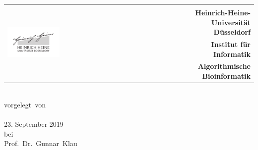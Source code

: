 \documentclass[12pt,a4paper,DIV12,oneside,chapterprefix,enabledeprecatedfontcommands]{book}
\makeatletter
\newcommand{\anfanglinks}{%
    \@openrightfalse
  }
\newcommand{\anfangrechts}{%
    \cleardoublepage
    \@openrighttrue
}
\makeatother
\begin{document}
\onehalfspacing
\frontmatter
{}
\begin{center}
\begin{tabularx}{0.97\textwidth}{lR}
 & \\
& \bf\large
Heinrich-Heine-Universit\"at D\"usseldorf\\
	 & \bf\large
Institut f\"ur Informatik\\
	 & \bf Algorithmische Bioinformatik
\end{tabularx}
\end{center}

\vfill
\begin{center}
\hspace*{-1cm}
\vspace*{1cm}\huge~\ ~\Typ\\
    \vspace{1cm}\normalsize vorgelegt\ von\\
    \large\Autor\\ 23. September 2019 \\%
    \vspace{1cm}\normalsize bei\\ \large Prof.\ Dr.\ Gunnar\ Klau \\
\end{center}
\cleardoublepage
\anfanglinks
{}

\printindex


\cleardoublepage
\listoffigures

\tableofcontents
\cleardoublepage

\anfangrechts
\mainmatter
\cleardoublepage

\backmatter
%


%





\cleardoublepage

\end{document}
